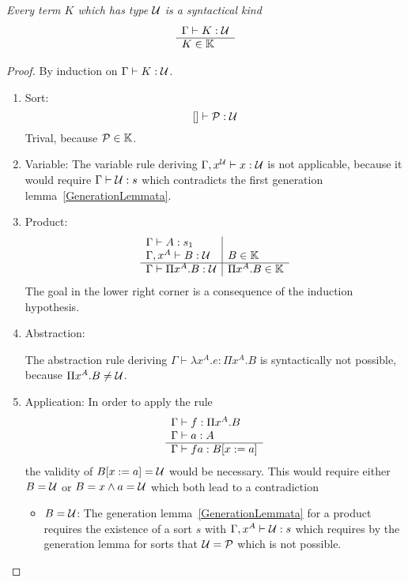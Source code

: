\begin{theorem}
    \label{TypeAnyImpliesKind}
    \emph{Every term $K$ which has type ${\cal U}$ is a syntactical kind}
    $$
    \begin{array}{l} 
        \Gamma \vdash K: {\cal U}
     \\ \hline 
        K \in \mathbb{K}
    \end{array}
    $$

    \begin{proof}
        By induction on $\Gamma \vdash K: {\cal U}$.

        \begin{enumerate}
        \item Sort:
            $$
            [] \vdash {\cal P}: {\cal U}
            $$
            Trival, because ${\cal P} \in \mathbb{K}$.

        \item Variable: The variable rule deriving $\Gamma, x^{\cal U} \vdash x:
            {\cal U}$ is not applicable, because it would require $\Gamma \vdash
                {\cal U} : s$ which contradicts the first generation
                lemma~\ref{GenerationLemmata}.

        \item Product:
            $$
            \begin{array}{l|l}
                \Gamma \vdash A: s_1
                \\
                \Gamma, x^A \vdash B: {\cal U}
                &
                B \in \mathbb{K}
                \\
                \hline
                \Gamma \vdash \Pi x^A. B : {\cal U}
                &
                \Pi x^A . B \in \mathbb{K}
            \end{array}
            $$
            The goal in the lower right corner is a consequence of the induction
                hypothesis.

        \item Abstraction:

            The abstraction rule deriving $\Gamma \vdash \lambda x^A. e : \Pi
                x^A. B$ is syntactically not possible, because $\Pi x^A.B \ne
                {\cal U}$.

        \item Application:
            In order to apply the rule
            $$
            \begin{array}{l} 
                \Gamma\vdash f: \Pi x^A. B
                \\
                \Gamma \vdash a: A
             \\ \hline 
                \Gamma \vdash f a : B[x:=a]
            \end{array}
            $$
            the validity of $B[x:=a] = {\cal U}$ would be necessary. This would
                require either $B = {\cal U}$ or $B = x \land a = {\cal U}$ which both
                lead to a contradiction
            \begin{itemize}
            \item $B = {\cal U}$: The generation lemma~\ref{GenerationLemmata} for a
                product requires the existence of a sort $s$ with $\Gamma, x^A
                    \vdash {\cal U} : s$ which requires by the generation lemma for
                    sorts that ${\cal U} = {\cal P}$ which is not possible.


\end{itemize}
\end{enumerate}
\end{proof}
\end{theorem}
